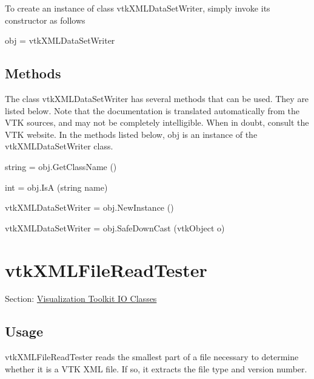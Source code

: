 To create an instance of class vtk\-X\-M\-L\-Data\-Set\-Writer, simply invoke its constructor as follows \begin{DoxyVerb}  obj = vtkXMLDataSetWriter
\end{DoxyVerb}
 \hypertarget{vtkwidgets_vtkxyplotwidget_Methods}{}\subsection{Methods}\label{vtkwidgets_vtkxyplotwidget_Methods}
The class vtk\-X\-M\-L\-Data\-Set\-Writer has several methods that can be used. They are listed below. Note that the documentation is translated automatically from the V\-T\-K sources, and may not be completely intelligible. When in doubt, consult the V\-T\-K website. In the methods listed below, {\ttfamily obj} is an instance of the vtk\-X\-M\-L\-Data\-Set\-Writer class. 
\begin{DoxyItemize}
\item {\ttfamily string = obj.\-Get\-Class\-Name ()}  
\item {\ttfamily int = obj.\-Is\-A (string name)}  
\item {\ttfamily vtk\-X\-M\-L\-Data\-Set\-Writer = obj.\-New\-Instance ()}  
\item {\ttfamily vtk\-X\-M\-L\-Data\-Set\-Writer = obj.\-Safe\-Down\-Cast (vtk\-Object o)}  
\end{DoxyItemize}\hypertarget{vtkio_vtkxmlfilereadtester}{}\section{vtk\-X\-M\-L\-File\-Read\-Tester}\label{vtkio_vtkxmlfilereadtester}
Section\-: \hyperlink{sec_vtkio}{Visualization Toolkit I\-O Classes} \hypertarget{vtkwidgets_vtkxyplotwidget_Usage}{}\subsection{Usage}\label{vtkwidgets_vtkxyplotwidget_Usage}
vtk\-X\-M\-L\-File\-Read\-Tester reads the smallest part of a file necessary to determine whether it is a V\-T\-K X\-M\-L file. If so, it extracts the file type and version number.

